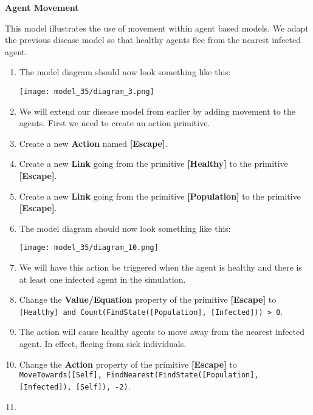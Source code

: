 \documentclass[]{memoir}
\makeatletter
\def\maxwidth{\ifdim\Gin@nat@width>\linewidth\linewidth
\else\Gin@nat@width\fi}
\let\Oldincludegraphics\includegraphics
\renewcommand{\includegraphics}[1]{\Oldincludegraphics[width=\maxwidth]{#1}}
\newcommand{\p}[1]{\textbf{{[}#1{]}}}
\newcommand{\e}[1]{\texttt{#1}}
\renewcommand{\a}[1]{\textbf{#1}}
\makeatother
\begin{document}
\begin{oframed}\textbf{Agent Movement} 

 This model illustrates the use of movement within agent based models. We adapt the previous disease model so that healthy agents flee from the nearest infected agent.

\begin{enumerate}
\item The model diagram should now look something like this: \par \begin{minipage}{\linewidth}  \centering \texttt{[image: model\_35/diagram\_3.png]}
\end{minipage}
\item 

We will extend our disease model from earlier by adding movement to the agents. First we need to create an action primitive.


\item Create a new \a{Action} named \p{Escape}.
\item Create a new \a{Link} going from the primitive \p{Healthy} to the primitive \p{Escape}.
\item Create a new \a{Link} going from the primitive \p{Population} to the primitive \p{Escape}.
\item The model diagram should now look something like this: \par \begin{minipage}{\linewidth}  \centering \texttt{[image: model\_35/diagram\_10.png]}
\end{minipage}
\item 

We will have this action be triggered when the agent is healthy and there is at least one infected agent in the simulation.


\item  Change the \a{Value/Equation} property of the primitive \p{Escape} to \e{[Healthy] and Count(FindState([Population], [Infected])) > 0}.
\item 

The action will cause healthy agents to move away from the nearest infected agent. In effect, fleeing from sick individuals.


\item  Change the \a{Action} property of the primitive \p{Escape} to \e{MoveTowards([Self], FindNearest(FindState([Population], [Infected]), [Self]), -2)}.
\item 


\end{enumerate}
\end{oframed}
\end{document}
